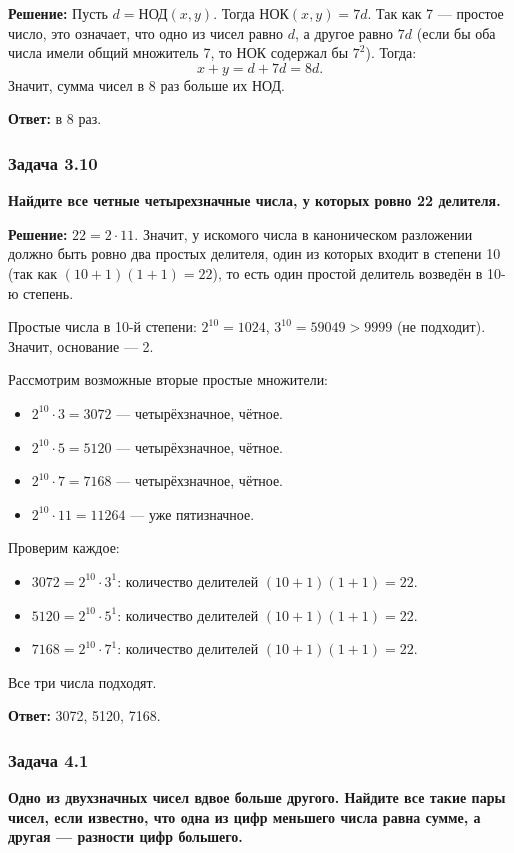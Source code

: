 \documentclass[12pt, a4paper]{article}
\begin{document}
\textbf{Решение:}
Пусть $d = \text{НОД}(x, y)$. Тогда $\text{НОК}(x, y) = 7d$. Так как 7 — простое число, это означает, что одно из чисел равно $d$, а другое равно $7d$ (если бы оба числа имели общий множитель 7, то НОК содержал бы $7^2$). Тогда:
\[
x + y = d + 7d = 8d.
\]
Значит, сумма чисел в 8 раз больше их НОД.

\textbf{Ответ:} в 8 раз.

\subsubsection*{Задача 3.10}
\textbf{Найдите все четные четырехзначные числа, у которых ровно 22 делителя.}

\textbf{Решение:}
$22 = 2 \cdot 11$. Значит, у искомого числа в каноническом разложении должно быть ровно два простых делителя, один из которых входит в степени 10 (так как $(10+1)(1+1) = 22$), то есть один простой делитель возведён в 10-ю степень.

Простые числа в 10-й степени: $2^{10} = 1024$, $3^{10} = 59049 > 9999$ (не подходит). Значит, основание — 2.

Рассмотрим возможные вторые простые множители:
\begin{itemize}
    \item $2^{10} \cdot 3 = 3072$ — четырёхзначное, чётное.
    \item $2^{10} \cdot 5 = 5120$ — четырёхзначное, чётное.
    \item $2^{10} \cdot 7 = 7168$ — четырёхзначное, чётное.
    \item $2^{10} \cdot 11 = 11264$ — уже пятизначное.
\end{itemize}
Проверим каждое:
\begin{itemize}
    \item $3072 = 2^{10} \cdot 3^1$: количество делителей $(10+1)(1+1) = 22$.
    \item $5120 = 2^{10} \cdot 5^1$: количество делителей $(10+1)(1+1) = 22$.
    \item $7168 = 2^{10} \cdot 7^1$: количество делителей $(10+1)(1+1) = 22$.
\end{itemize}
Все три числа подходят.

\textbf{Ответ:} 3072, 5120, 7168.

\subsubsection*{Задача 4.1}
\textbf{Одно из двухзначных чисел вдвое больше другого. Найдите все такие пары чисел, если известно, что одна из цифр меньшего числа равна сумме, а другая — разности цифр большего.}
\end{document}
